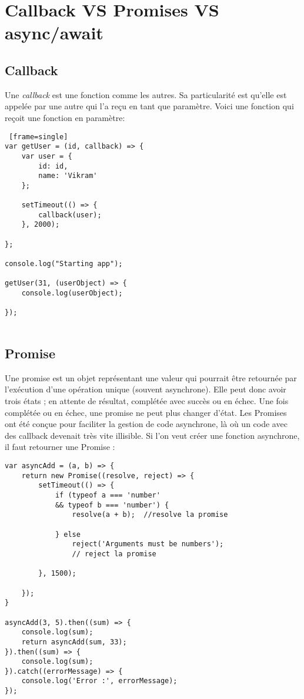\documentclass[a4paper,10pt]{article}
\begin{document}
\section{Callback VS Promises VS async/await}
\subsection{Callback}
Une \emph{callback} est une fonction comme les autres. Sa particularité est qu'elle est appelée par une autre qui l'a reçu en tant que paramètre. Voici une fonction qui reçoit une fonction en paramètre:
\begin{lstlisting} [frame=single]
var getUser = (id, callback) => {
    var user = {
        id: id,
        name: 'Vikram'
    };

    setTimeout(() => {
        callback(user);
    }, 2000);

};

console.log("Starting app");

getUser(31, (userObject) => {
    console.log(userObject);

});
    
\end{lstlisting} 

\subsection{Promise}
Une promise est un objet représentant une valeur qui pourrait être retournée par l'exécution d'une opération unique (souvent asynchrone). Elle peut donc avoir trois états ; en attente de résultat, complétée avec succès ou en échec. Une fois complétée ou en échec, une promise ne peut plus changer d'état. Les Promises ont été conçue pour faciliter la gestion de code asynchrone, là où un code avec des callback devenait très vite illisible.
Si l'on veut créer une fonction asynchrone, il faut retourner une Promise : 

\begin{lstlisting}[frame=single]
var asyncAdd = (a, b) => {
    return new Promise((resolve, reject) => {
        setTimeout(() => {
            if (typeof a === 'number' 
            && typeof b === 'number') {
                resolve(a + b);  //resolve la promise
               
            } else
                reject('Arguments must be numbers');
                // reject la promise

        }, 1500);

    });
}

asyncAdd(3, 5).then((sum) => {
    console.log(sum);
    return asyncAdd(sum, 33);
}).then((sum) => {
    console.log(sum);
}).catch((errorMessage) => {
    console.log('Error :', errorMessage);
});
    
\end{lstlisting}
\end{document}
